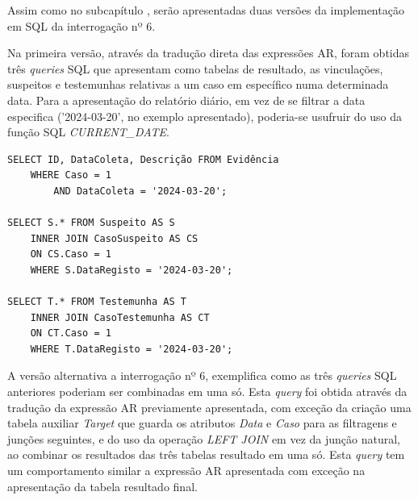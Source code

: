 \documentclass[a4paper,12pt]{scrreprt}
\begin{document}
Assim como no subcapítulo \textit{}, serão apresentadas duas versões da implementação em SQL da interrogação nº 6.

Na primeira versão, através da tradução direta das expressões AR, foram obtidas três \textit{queries} SQL que apresentam como tabelas de resultado, as vinculações, suspeitos e testemunhas relativas a um caso em específico numa determinada data. Para a apresentação do relatório diário, em vez de se filtrar a data especifica ('2024-03-20', no exemplo apresentado), poderia-se usufruir do uso da função SQL \textit{CURRENT\_DATE}.

\vspace{0.4cm}
\begin{lstlisting}[escapechar=!]
SELECT ID, DataColeta, Descrição FROM Evidência
	WHERE Caso = 1
		AND DataColeta = '2024-03-20';

SELECT S.* FROM Suspeito AS S
	INNER JOIN CasoSuspeito AS CS
    ON CS.Caso = 1
    WHERE S.DataRegisto = '2024-03-20';

SELECT T.* FROM Testemunha AS T
	INNER JOIN CasoTestemunha AS CT
    ON CT.Caso = 1
    WHERE T.DataRegisto = '2024-03-20';
\end{lstlisting}

\vspace{1cm}

A versão alternativa a interrogação nº 6, exemplifica como as três \textit{queries} SQL anteriores poderiam ser combinadas em uma só. Esta \textit{query} foi obtida através da tradução da expressão AR previamente apresentada, com exceção da criação uma tabela auxiliar \textit{Target} que guarda os atributos \textit{Data} e \textit{Caso} para as filtragens e junções seguintes, e do uso da operação \textit{LEFT JOIN} em vez da junção natural, ao combinar os resultados das três tabelas resultado em uma só. Esta \textit{query} tem um comportamento similar a expressão AR apresentada com exceção
na apresentação da tabela resultado final.

\clearpage
{}
\end{document}
